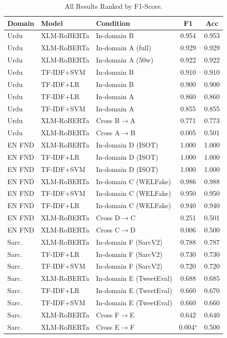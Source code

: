 \documentclass[conference]{IEEEtran}
\begin{document}
\begin{table}[!htb]
\centering
\caption{All Results Ranked by F1-Score.}
\label{tab:summary}
\setlength{\tabcolsep}{4pt}
\begin{tabular}{llp{5cm}cc}
\toprule
\textbf{Domain} & \textbf{Model} & \textbf{Condition} & \textbf{F1} & \textbf{Acc} \\
\midrule
Urdu   & XLM-RoBERTa & In-domain B         & 0.954 & 0.953 \\
Urdu   & XLM-RoBERTa & In-domain A (full)  & 0.929 & 0.929 \\
Urdu   & XLM-RoBERTa & In-domain A (50w)   & 0.922 & 0.922 \\
Urdu   & TF-IDF+SVM  & In-domain B         & 0.910 & 0.910 \\
Urdu   & TF-IDF+LR   & In-domain B         & 0.900 & 0.900 \\
Urdu   & TF-IDF+LR   & In-domain A         & 0.860 & 0.860 \\
Urdu   & TF-IDF+SVM  & In-domain A         & 0.855 & 0.855 \\
Urdu   & XLM-RoBERTa & Cross B$\to$A       & 0.771 & 0.773 \\
Urdu   & XLM-RoBERTa & Cross A$\to$B       & 0.005 & 0.501 \\
\midrule
EN FND & XLM-RoBERTa & In-domain D (ISOT)  & 1.000 & 1.000 \\
EN FND & TF-IDF+LR   & In-domain D (ISOT)  & 1.000 & 1.000 \\
EN FND & TF-IDF+SVM  & In-domain D (ISOT)  & 1.000 & 1.000 \\
EN FND & XLM-RoBERTa & In-domain C (WELFake) & 0.986 & 0.988 \\
EN FND & TF-IDF+SVM  & In-domain C (WELFake) & 0.950 & 0.950 \\
EN FND & TF-IDF+LR   & In-domain C (WELFake) & 0.940 & 0.940 \\
EN FND & XLM-RoBERTa & Cross D$\to$C       & 0.251 & 0.501 \\
EN FND & XLM-RoBERTa & Cross C$\to$D       & 0.006 & 0.500 \\
\midrule
Sarc.  & XLM-RoBERTa & In-domain F (SarcV2)  & 0.788 & 0.787 \\
Sarc.  & TF-IDF+LR   & In-domain F (SarcV2)  & 0.730 & 0.730 \\
Sarc.  & TF-IDF+SVM  & In-domain F (SarcV2)  & 0.720 & 0.720 \\
Sarc.  & XLM-RoBERTa & In-domain E (TweetEval) & 0.688 & 0.685 \\
Sarc.  & TF-IDF+LR   & In-domain E (TweetEval) & 0.660 & 0.670 \\
Sarc.  & TF-IDF+SVM  & In-domain E (TweetEval) & 0.660 & 0.660 \\
Sarc.  & XLM-RoBERTa & Cross F$\to$E       & 0.642 & 0.640 \\
Sarc.  & XLM-RoBERTa & Cross E$\to$F       & 0.004$^{\star}$ & 0.500 \\
\bottomrule
\end{tabular}
\end{table}
\end{document}
